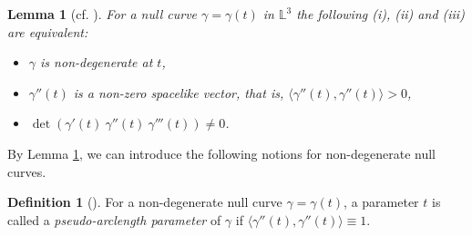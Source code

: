 \documentclass[11pt,reqno]{amsart}
\theoremstyle{plain} %
\newtheorem{lemma}[theorem]{Lemma}
\theoremstyle{definition}
\newtheorem{definition}[theorem]{Definition}
\begin{document}
\begin{lemma}[cf. \cite{O}]\label{lemma:non-deg}
For a null curve $\gamma=\gamma(t)$ in $\mathbb{L}^3$ %
the following (i), (ii) and (iii) are equivalent:
\begin{itemize}
\item[(i)] $\gamma$ is non-degenerate at $t$,
\item[(ii)] $\gamma''(t)$ is a non-zero spacelike vector, that is, $\langle \gamma''(t), \gamma''(t) \rangle >0$,
\item[(iii)] $\det\left(\gamma'(t)\ \gamma''(t)\ \gamma'''(t)\right)\neq 0$.
\end{itemize}\end{lemma}

By Lemma \ref{lemma:non-deg}, we can introduce the following notions for non-degenerate null curves.

\begin{definition}[\cite{B, V}]
For a non-degenerate null curve $\gamma=\gamma(t)$, a parameter $t$ is called a {\it pseudo-arclength parameter} of $\gamma$ if  $\langle \gamma''(t), \gamma''(t) \rangle \equiv 1$.
\end{definition}
\end{document}
